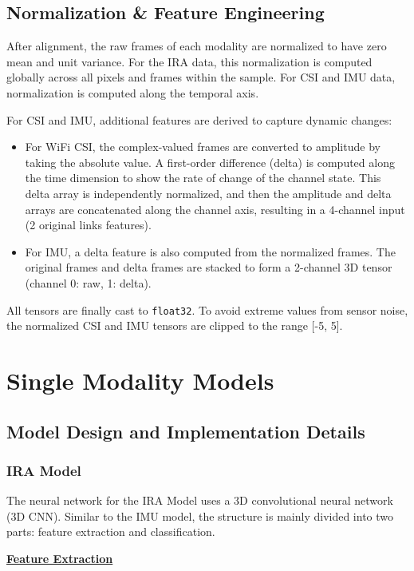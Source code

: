 \subsection{Normalization & Feature Engineering}
After alignment, the raw frames of each modality are normalized to have zero mean and unit variance. For the IRA data, this normalization is computed globally across all pixels and frames within the sample. For CSI and IMU data, normalization is computed along the temporal axis.

For CSI and IMU, additional features are derived to capture dynamic changes:
\begin{itemize}
	\item For WiFi CSI, the complex-valued frames are converted to amplitude by taking the absolute value. A first-order difference (delta) is computed along the time dimension to show the rate of change of the channel state. This delta array is independently normalized, and then the amplitude and delta arrays are concatenated along the channel axis, resulting in a 4-channel input (2 original links  features).
	\item For IMU, a delta feature is also computed from the normalized frames. The original frames and delta frames are stacked to form a 2-channel 3D tensor (channel 0: raw, 1: delta).
\end{itemize}

All tensors are finally cast to \texttt{float32}. To avoid extreme values from sensor noise, the normalized CSI and IMU tensors are clipped to the range [-5, 5].

\section{Single Modality Models}

\subsection{Model Design and Implementation Details}

\subsubsection{IRA Model}

The neural network for the IRA Model uses a 3D convolutional neural network (3D CNN). Similar to the IMU model, the structure is mainly divided into two parts: feature extraction and classification.

\textbf{\underline{Feature Extraction}}

